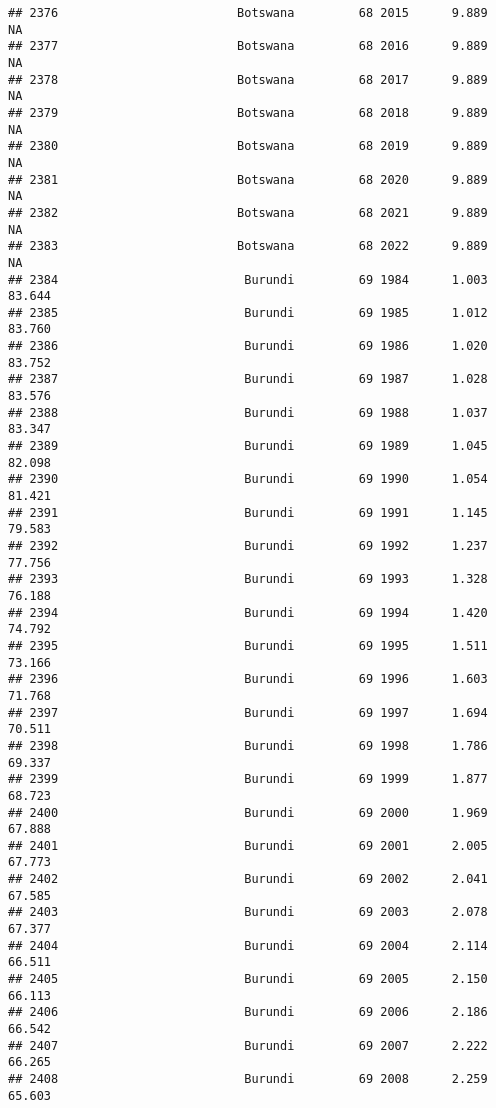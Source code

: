 \documentclass[
]{article}
\begin{document}
\begin{verbatim}
## 2376                         Botswana         68 2015      9.889         NA
## 2377                         Botswana         68 2016      9.889         NA
## 2378                         Botswana         68 2017      9.889         NA
## 2379                         Botswana         68 2018      9.889         NA
## 2380                         Botswana         68 2019      9.889         NA
## 2381                         Botswana         68 2020      9.889         NA
## 2382                         Botswana         68 2021      9.889         NA
## 2383                         Botswana         68 2022      9.889         NA
## 2384                          Burundi         69 1984      1.003     83.644
## 2385                          Burundi         69 1985      1.012     83.760
## 2386                          Burundi         69 1986      1.020     83.752
## 2387                          Burundi         69 1987      1.028     83.576
## 2388                          Burundi         69 1988      1.037     83.347
## 2389                          Burundi         69 1989      1.045     82.098
## 2390                          Burundi         69 1990      1.054     81.421
## 2391                          Burundi         69 1991      1.145     79.583
## 2392                          Burundi         69 1992      1.237     77.756
## 2393                          Burundi         69 1993      1.328     76.188
## 2394                          Burundi         69 1994      1.420     74.792
## 2395                          Burundi         69 1995      1.511     73.166
## 2396                          Burundi         69 1996      1.603     71.768
## 2397                          Burundi         69 1997      1.694     70.511
## 2398                          Burundi         69 1998      1.786     69.337
## 2399                          Burundi         69 1999      1.877     68.723
## 2400                          Burundi         69 2000      1.969     67.888
## 2401                          Burundi         69 2001      2.005     67.773
## 2402                          Burundi         69 2002      2.041     67.585
## 2403                          Burundi         69 2003      2.078     67.377
## 2404                          Burundi         69 2004      2.114     66.511
## 2405                          Burundi         69 2005      2.150     66.113
## 2406                          Burundi         69 2006      2.186     66.542
## 2407                          Burundi         69 2007      2.222     66.265
## 2408                          Burundi         69 2008      2.259     65.603

\end{verbatim}
\end{document}
